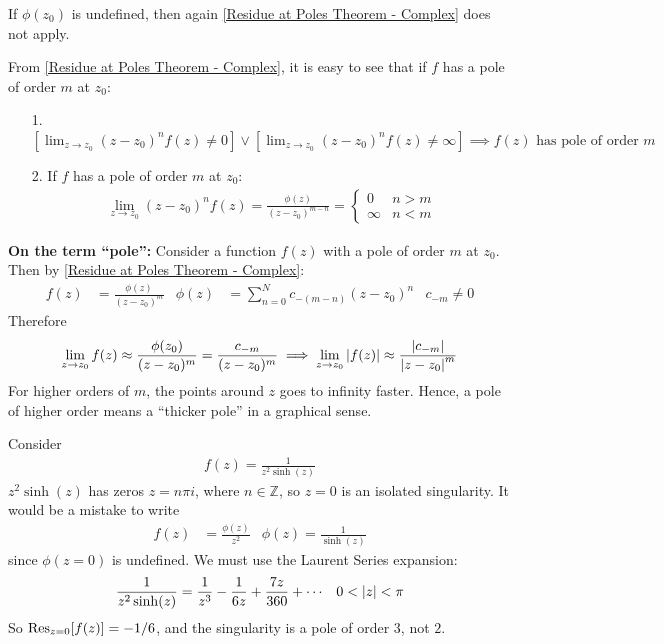 \documentclass[12pt, english]{book}
\begin{document}
	If \(\phi(z_0)\) is undefined, then again \cref{Residue at Poles Theorem - Complex} does not apply.
	
	From \cref{Residue at Poles Theorem - Complex}, it is easy to see that if \(f\) has a pole of order \(m\) at \(z_0\):
	\begin{itemize}
		\item[1.] \([\lim_{z \rightarrow z_0} (z-z_0)^n f(z) \neq 0] \lor [\lim_{z \rightarrow z_0} (z-z_0)^n f(z) \neq \infty] \implies f(z) \text{ has pole of order } m\)
		\item[2.] If \(f\) has a pole of order \(m\) at \(z_0\):
		\begin{align*}
			\lim_{z\rightarrow z_0} (z-z_0)^n f(z) = \frac{\phi(z)}{(z-z_0)^{m-n}} = 
			\begin{cases}
				0 & n > m \\ \infty & n < m
			\end{cases}
		\end{align*}
	\end{itemize}

	\textbf{On the term ``pole'':} \newline
	Consider a function \(f(z)\) with a pole of order \(m\) at \(z_0\). Then by \cref{Residue at Poles Theorem - Complex}:
	\begin{align*}
		f(z) &= \frac{\phi(z)}{(z-z_0)^m} &
		\phi(z) &= \sum_{n=0}^{N} c_{-(m-n)} (z-z_0)^n & c_{-m} \neq 0
	\end{align*}
	Therefore
	\begin{align*}
		\lim_{z\rightarrow z_0} f(z) \approx \frac{\phi(z_0)}{(z-z_0)^m} = \frac{c_{-m}}{(z-z_0)^m} 
		\implies \lim_{z\rightarrow z_0} \abs{f(z)} \approx \frac{\abs{c_{-m}}}{\abs{z-z_0}^m}
	\end{align*}
	For higher orders of \(m\), the points around \(z\) goes to infinity faster. Hence, a pole of higher order means a ``thicker pole'' in a graphical sense. 
	
	\begin{example}
		Consider 
		\begin{align*}
			f(z) = \frac{1}{z^2 \sinh(z)}
		\end{align*}
		\(z^2 \sinh(z)\) has zeros \(z = n \pi i\), where \(n \in \mathbb{Z}\), so \(z = 0\) is an isolated singularity. It would be a mistake to write
		\begin{align*}
			f(z) &= \frac{\phi(z)}{z^2} & \phi(z) = \frac{1}{\sinh(z)}
		\end{align*}
		since \(\phi(z=0)\) is undefined. We must use the Laurent Series expansion:
		\begin{align*}
			\frac{1}{z^2 \sinh(z)} &= \frac{1}{z^3} - \frac{1}{6z} + \frac{7z}{360} + \cdots
				& 0 < \abs{z} < \pi
		\end{align*}
		So \(\Res_{z=0}[f(z)] = -1/6\), and the singularity is a pole of order \(3\), not \(2\).
	\end{example}
\end{document}
